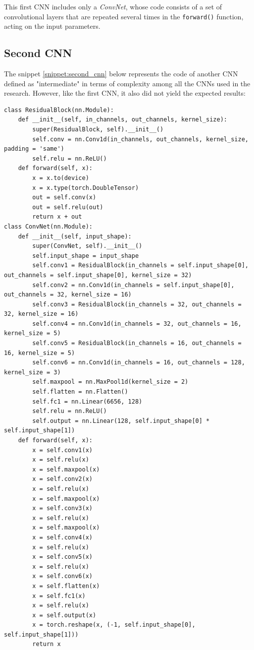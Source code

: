 \documentclass[12pt,italian]{report}
\begin{document}
This first CNN includes only a \textit{ConvNet}, whose code consists of a set of convolutional layers that are repeated several times in the \texttt{forward()} function, acting on the input parameters.

\subsection{Second CNN}
\label{subsec:second_cnn}

The snippet \ref{snippet:second_cnn} below represents the code of another CNN defined as "intermediate" in terms of complexity among all the CNNs used in the research. However, like the first CNN, it also did not yield the expected results:

\lstset{language=Python}
\begin{lstlisting}[aboveskip=15pt, belowskip=15pt, basicstyle=\fontsize{8}{10}\selectfont, keywordstyle=\color{blue}, breaklines=true, label=snippet:second_cnn]
class ResidualBlock(nn.Module):
    def __init__(self, in_channels, out_channels, kernel_size):
        super(ResidualBlock, self).__init__()
        self.conv = nn.Conv1d(in_channels, out_channels, kernel_size, padding = 'same')
        self.relu = nn.ReLU()
    def forward(self, x):
        x = x.to(device)
        x = x.type(torch.DoubleTensor)
        out = self.conv(x)
        out = self.relu(out)
        return x + out
class ConvNet(nn.Module):
    def __init__(self, input_shape):
        super(ConvNet, self).__init__()
        self.input_shape = input_shape
        self.conv1 = ResidualBlock(in_channels = self.input_shape[0], out_channels = self.input_shape[0], kernel_size = 32)
        self.conv2 = nn.Conv1d(in_channels = self.input_shape[0], out_channels = 32, kernel_size = 16)
        self.conv3 = ResidualBlock(in_channels = 32, out_channels = 32, kernel_size = 16)
        self.conv4 = nn.Conv1d(in_channels = 32, out_channels = 16, kernel_size = 5)
        self.conv5 = ResidualBlock(in_channels = 16, out_channels = 16, kernel_size = 5)
        self.conv6 = nn.Conv1d(in_channels = 16, out_channels = 128, kernel_size = 3)
        self.maxpool = nn.MaxPool1d(kernel_size = 2)
        self.flatten = nn.Flatten()
        self.fc1 = nn.Linear(6656, 128)
        self.relu = nn.ReLU()
        self.output = nn.Linear(128, self.input_shape[0] * self.input_shape[1])
    def forward(self, x):
        x = self.conv1(x)
        x = self.relu(x)
        x = self.maxpool(x)
        x = self.conv2(x)
        x = self.relu(x)
        x = self.maxpool(x)
        x = self.conv3(x)
        x = self.relu(x)
        x = self.maxpool(x)
        x = self.conv4(x)
        x = self.relu(x)
        x = self.conv5(x)
        x = self.relu(x)
        x = self.conv6(x)
        x = self.flatten(x)
        x = self.fc1(x)
        x = self.relu(x)
        x = self.output(x)
        x = torch.reshape(x, (-1, self.input_shape[0], self.input_shape[1]))
        return x
\end{lstlisting}
\end{document}
